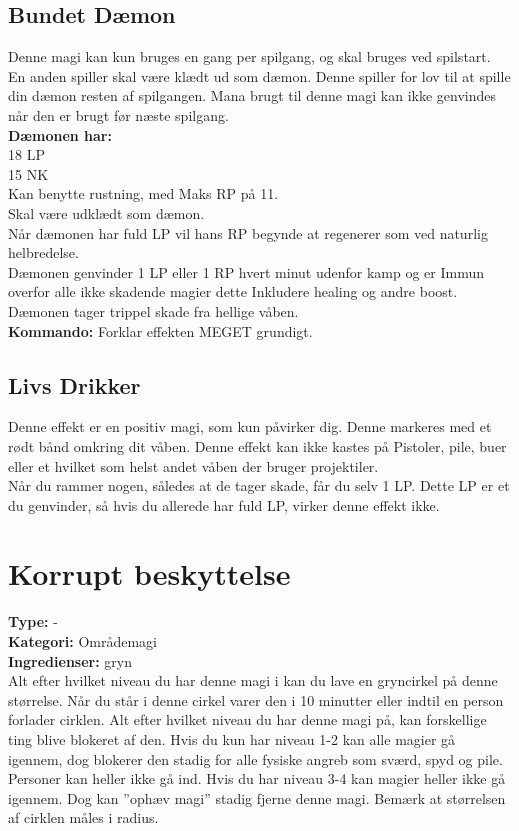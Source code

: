 \subsection{Bundet Dæmon}
Denne magi kan kun bruges en gang per spilgang, og skal bruges ved spilstart. En anden spiller skal være klædt ud som dæmon. Denne spiller for lov til at spille din dæmon resten af spilgangen. Mana brugt til denne magi kan ikke genvindes når den er brugt før næste spilgang.\\
\textbf{Dæmonen har:}\\
18 LP\\ 
15 NK\\
Kan benytte rustning, med Maks RP på 11.\\
Skal være udklædt som dæmon.\\
Når dæmonen har fuld LP vil hans RP begynde at regenerer som ved naturlig helbredelse.\\ 
Dæmonen genvinder 1 LP eller 1 RP hvert minut udenfor kamp og er Immun overfor alle ikke skadende magier dette Inkludere healing og andre boost.\\
Dæmonen tager trippel skade fra hellige våben.\\
\textbf{Kommando:} Forklar effekten MEGET grundigt.

\subsection{Livs Drikker}
Denne effekt er en positiv magi, som kun påvirker dig. Denne markeres med et rødt bånd omkring dit våben. Denne effekt kan ikke kastes på Pistoler, pile, buer eller et hvilket som helst andet våben der bruger projektiler.\\ 
Når du rammer nogen, således at de tager skade, får du selv 1 LP. Dette LP er et du genvinder, så hvis du allerede har fuld LP, virker denne effekt ikke.\\

\section{Korrupt beskyttelse}
\textbf{Type:} - \\
\textbf{Kategori:} Områdemagi\\
\textbf{Ingredienser:} gryn\\
Alt efter hvilket niveau du har denne magi i kan du lave en gryncirkel på denne størrelse. Når du står i denne cirkel varer den i 10 minutter eller indtil en person forlader cirklen. Alt efter hvilket niveau du har denne magi på, kan forskellige ting blive blokeret af den. Hvis du kun har niveau 1-2 kan alle magier gå igennem, dog blokerer den stadig for alle fysiske angreb som sværd, spyd og pile. Personer kan heller ikke gå ind. Hvis du har niveau 3-4 kan magier heller ikke gå igennem. Dog kan ”ophæv magi” stadig fjerne denne magi. Bemærk at størrelsen af cirklen måles i radius.
